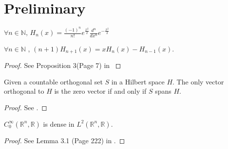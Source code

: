 \chapter{Preliminary}

\begin{definition}
$\forall n \in \mathbb{N}$, 
$H_{n}(x) = \frac{(-1)^n}{n!}e^{\frac{x^2}{2}}\frac{d^n}{d x^n} e^{-\frac{x^2}{2}}$
\end{definition}

\begin{property}
$\forall n \in \mathbb{N}$
, $(n + 1)H_{n+1}(x) = x H_{n}(x) - H_{n-1}(x)$. 
\end{property}

\begin{theorem}
\label{theorem:Doob-Dynkin Lemma}
\end{theorem}

\begin{proof}
See Proposition  3(Page 7) in
\cite{ProbabilityTheorywithApplications}
\end{proof}

\begin{theorem}
\label{theorem:zero is the only vector orthogonal to dense}
Given a countable orthogonal set $S$ in a Hilbert space $H$. The only vector orthogonal to $H$ is the zero vector if and only if $S$ spans $H$.
\end{theorem}

\begin{proof}
See \cite{AnIntroductiontoHilbertSpace}. 
\end{proof}

\begin{theorem}
\label{theorem:compact support smooth function is dense in L^2}
$C_{0}^{\infty}(\mathbb{R}^n, \mathbb{R})$ is dense in $L^2(\mathbb{R}^n, \mathbb{R})$. 
\end{theorem}

\begin{proof}
See Lemma 3.1 (Page 222) in 
\cite{RealAnalysisMeasureTheoryIntegrationandHilbertSpaces}. 
\end{proof}

